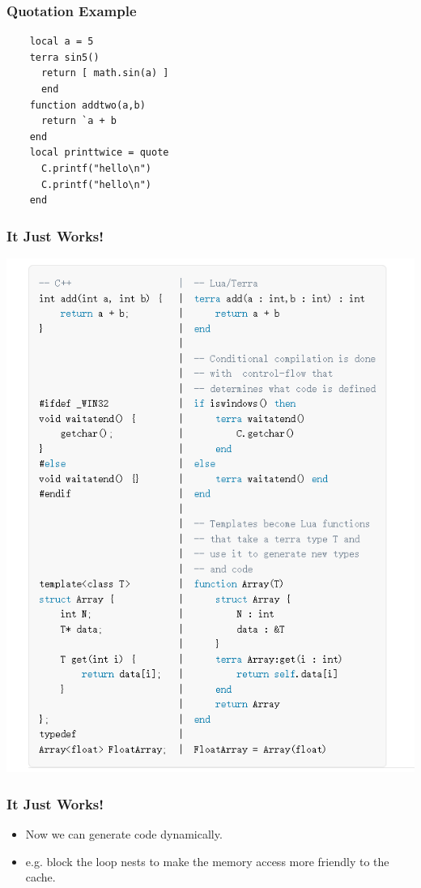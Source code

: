 \documentclass{beamer}
\begin{document}
\begin{frame}[fragile]
  \frametitle{Quotation Example}
  \begin{lstlisting}
    local a = 5
    terra sin5()
      return [ math.sin(a) ]
      end
    function addtwo(a,b)
      return `a + b
    end
    local printtwice = quote
      C.printf("hello\n")
      C.printf("hello\n")
    end
  \end{lstlisting}
\end{frame}

\begin{frame}
	\frametitle{It Just Works!}
  \begin{center}
    \includegraphics[scale=0.45]{terra2.png}
  \end{center}
\end{frame}

\begin{frame}
	\frametitle{It Just Works!}
  \begin{itemize}
  \item Now we can generate code dynamically.\pause
  \item e.g. block the loop nests to make the memory access more friendly to the cache.
  \end{itemize}
\end{frame}
\end{document}
